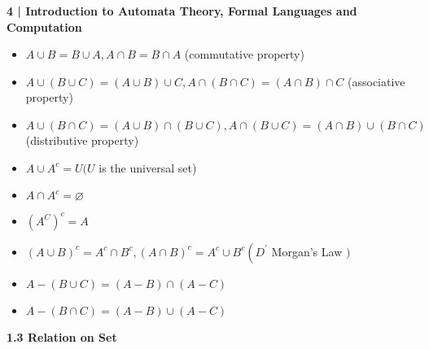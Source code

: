 \documentclass [10pt,a4paper]{book}
\begin{document}
\begin{flushleft}
\textbf{4 | Introduction to Automata Theory, Formal Languages and Computation}
\end{flushleft}


\begin{itemize}
\item
$ A \cup B=B \cup A, A \cap B=B \cap A$ (commutative property)
\item
$ A \cup(B \cup C)=(A \cup B) \cup C, A \cap(B \cap C)=(A \cap B) \cap C$ (associative property)
\item
$ A \cup(B \cap C)=(A \cup B) \cap(B \cup C), A \cap(B \cup C)=(A \cap B) \cup(B \cap C)$ (distributive property)
\item
$ A \cup A^{c}=U(U$ is the universal set)
\item
$ A \cap A^{c}=\varnothing$
\item
$\left(A^{C}\right)^{c}=A$
\item
$(A \cup B)^{c}=A^{c} \cap B^{c},(A \cap B)^{c}=A^{c} \cup B^{c}\left(D^{\prime}\right.$ Morgan's Law $)$
\item
$ A-(B \cup C)=(A-B) \cap(A-C)$
\item
$ A-(B \cap C)=(A-B) \cup(A-C)$
\end{itemize}

\textbf{1.3 Relation on Set}
\end{document}
